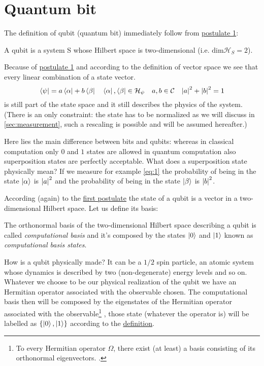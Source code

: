 \section{Quantum bit}
The definition of qubit (quantum bit) immediately follow from \hyperref[postulate:1]{postulate 1}:
\begin{defn}
A qubit is a system S whose Hilbert space is two-dimensional (i.e. $\text{dim}\mathcal{H}_S = 2$).
\end{defn}
Because of \hyperref[postulate:1]{postulate 1} and according to the definition of vector space we see that every linear combination of a state vector.
\begin{equation}\label{eq:1}
    \bra{\psi} = a \bra{\alpha} + b \bra{\beta} \quad \bra{\alpha},\bra{\beta} \in \mathcal{H}_\psi \quad a,b \in \mathcal{C} \quad \abs{a}^2 + \abs{b}^2 = 1
\end{equation}
is still part of the state space and it still describes the physics of the system. (There is an only constraint: the state has to be normalized as we will discuss in \ref{sec:measurement}, such a rescaling is possible and will be assumed hereafter.) 

Here lies the main difference between bits and qubits: whereas in classical computation only $0$ and $1$ states are allowed in quantum computation also superposition states are perfectly acceptable. What does a superposition state physically mean? If we measure for example \ref{eq:1} the probability of being in the state $\ket{\alpha}$ is  $\abs{a}^2$ and the probability of being in the state $\ket{\beta}$ is $\abs{b}^2$.

According (again) to the \hyperref[postulate:1]{first postulate} the state of a qubit is a vector in a two-dimensional Hilbert space. Let us define its basis:
\begin{defn}\label{def:computational-basis}
The orthonormal basis of the two-dimensional Hilbert space describing a qubit is called \emph{computational basis} and it's composed by the states $\ket{0}$ and $\ket{1}$ known as \emph{computational basis states}.
\end{defn}
How is a qubit physically made?
It can be a $1/2$ spin particle, an atomic system whose dynamics is described by two (non-degenerate) energy levels and so on.
Whatever we choose to be our physical realization of the qubit we have an Hermitian operator associated with the observable chosen. The computational basis then will be composed by the eigenstates of the Hermitian operator associated with the observable\footnote{To every Hermitian operator $\Omega$, there exist (at least) a basis consisting of its orthonormal eigenvectors. \cite[p.36]{Shankar}.} , those state (whatever the operator is) will be labelled as $\{\ket{0},\ket{1}\}$ according to the \hyperref[def:computational-basis]{definition}.

